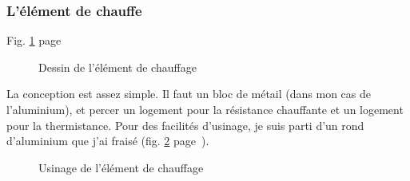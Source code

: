 \subsubsection{L'élément de chauffe}%
\noindent Fig. \ref{sch_chauffe} page~\pageref{sch_chauffe} \par %
\begin{figure}%
   \caption{\label{sch_chauffe} Dessin de l'élément de chauffage}%
\end{figure}%
La conception est assez simple. Il faut un bloc de métail (dans mon cas de l'aluminium), et %
percer un logement pour la résistance chauffante et un logement pour la thermistance.%
Pour des facilités d'usinage, je suis parti d'un rond d'aluminium que j'ai fraisé %
(fig. \ref{usinage_chauffe} page~\pageref{usinage_chauffe}).%
\begin{figure}%
   \caption{\label{usinage_chauffe} Usinage de l'élément de chauffage}%
\end{figure}%
